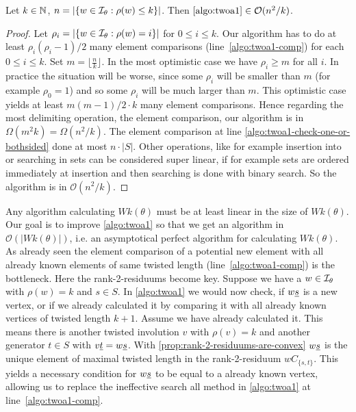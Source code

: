\begin{lemm}
	Let $k \in \mathbb{N}$, $n = |\{ w \in \mathcal{I}_{\theta} : \rho(w) \leq k \}|$. Then $\ref{algo:twoa1} \in \mathcal{O}(n^2/k)$.

	\begin{proof}
		Let $\rho_i = |\{ w \in \mathcal{I}_{\theta} : \rho(w) = i \}|$ for $0 \leq i \leq k$. Our algorithm has to do at least $\rho_i (\rho_i - 1)/2$ many element comparisons (line~\ref{algo:twoa1-comp}) for each $0 \leq i \leq k$. Set $m = \lfloor \frac{n}{k} \rfloor$. In the most optimistic case we have $\rho_i \geq m$ for all $i$. In practice the situation will be worse, since some $\rho_i$ will be smaller than $m$ (for example $\rho_0 = 1$) and so some $\rho_i$ will be much larger than $m$. This optimistic case yields at least $m(m-1)/2 \cdot k$ many element comparisons. Hence regarding the most delimiting operation, the element comparison, our algorithm is in $\Omega(m^2k) = \Omega(n^2 / k)$. The element comparison at line \ref{algo:twoa1-check-one-or-bothsided} done at most $n \cdot |S|$. Other operations, like for example insertion into or searching in sets can be considered super linear, if for example sets are ordered immediately at insertion and then searching is done with binary search. So the algorithm is in $\mathcal{O}(n^2 / k)$.
	\end{proof}
\end{lemm}

Any algorithm calculating $Wk(\theta)$ must be at least linear in the size of $Wk(\theta)$. Our goal is to improve \ref{algo:twoa1} so that we get an algorithm in $\mathcal{O}(|Wk(\theta)|)$, i.e. an asymptotical perfect algorithm for calculating $Wk(\theta)$. As already seen the element comparison of a potential new element with all already known elements of same twisted length (line~\ref{algo:twoa1-comp}) is the bottleneck. Here the rank-2-residuums become key. Suppose we have a $w \in \mathcal{I}_{\theta}$ with $\rho(w) = k$ and $s \in S$. In \ref{algo:twoa1} we would now check, if $w \underline{s}$ is a new vertex, or if we already calculated it by comparing it with all already known vertices of twisted length $k + 1$. Assume we have already calculated it. This means there is another twisted involution $v$ with $\rho(v) = k$ and another generator $t \in S$ with $v \underline{t} = w \underline{s}$. With \ref{prop:rank-2-residuums-are-convex} $w \underline{s}$ is the unique element of maximal twisted length in the rank-2-residuum $wC_{\{s,t\}}$. This yields a necessary condition for $w \underline{s}$ to be equal to a already known vertex, allowing us to replace the ineffective search all method in \ref{algo:twoa1} at line~\ref{algo:twoa1-comp}.

